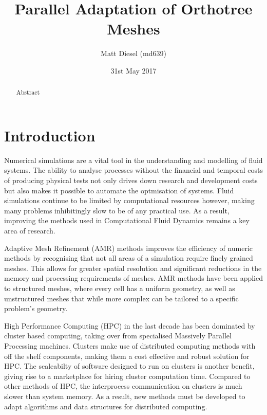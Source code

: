 \documentclass[twoside]{IIBproject}
\numberwithin{figure}{section}
\begin{document}
\date{31st May 2017}
\author{Matt Diesel (md639)}
\title{Parallel Adaptation of Orthotree Meshes}

\pagestyle{empty}
\maketitle

\thispagestyle{empty}
\renewcommand{\abstractname}{Technical Abstract}
\begin{abstract}
Abstract
\end{abstract}

\newpage
\setcounter{tocdepth}{2}
\tableofcontents
\newpage
\pagestyle{plain}


\section{Introduction} %
    \label{sec:intro}

    Numerical simulations are a vital tool in the understanding and modelling of fluid systems. The ability to analyse processes without the financial and temporal costs of producing physical tests not only drives down research and development costs but also makes it possible to automate the optmisation of systems. Fluid simulations continue to be limited by computational resources however, making many problems inhibitingly slow to be of any practical use. As a result, improving the methods used in Computational Fluid Dynamics remains a key area of research.

    Adaptive Mesh Refinement (AMR) methods improves the efficiency of numeric methods by recognising that not all areas of a simulation require finely grained meshes. This allows for greater spatial resolution and significant reductions in the memory and processing requirements of meshes. AMR methods have been applied to structured meshes, where every cell has a uniform geometry, as well as unstructured meshes that while more complex can be tailored to a specific problem's geometry. 

    High Performance Computing (HPC) in the last decade has been dominated by cluster based computing, taking over from specialised Massively Parallel Processing machines. Clusters make use of distributed computing methods with off the shelf components, making them a cost effective and robust solution for HPC. The scaleabilty of software designed to run on clusters is another benefit, giving rise to a marketplace for hiring cluster computation time. Compared to other methods of HPC, the interprocess communication on clusters is much slower than system memory. As a result, new methods must be developed to adapt algorithms and data structures for distributed computing.
\end{document}
